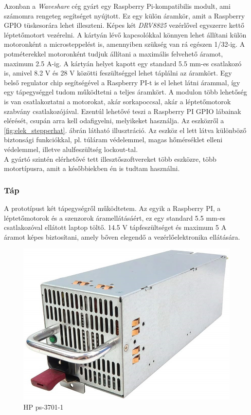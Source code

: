 \documentclass[12pt,a4paper]{article}
\begin{document}
Azonban a \textsl{Waveshare} cég gyárt egy Raspberry Pi-kompatibilis modult, ami számomra rengeteg segítséget nyújtott. Ez egy külön áramkör, amit a Raspberry GPIO tüskesorára lehet illeszteni. Képes két \textsl{DRV8825} vezérlővel egyszerre kettő léptetőmotort vezérelni. A kártyán lévő kapcsolókkal könnyen lehet állítani külön motoronként a microsteppelést is, amennyiben szükség van rá egészen 1/32-ig. A potméterekkel motoronként tudjuk állítani a maximális felvehető áramot, maximum 2.5 A-ig. A kártyán helyet kapott egy standard 5.5 mm-es csatlakozó is, amivel 8.2 V és 28 V közötti feszültséggel lehet táplálni az áramkört. Egy belső regulator chip segítségével a Raspberry PI-t is el lehet látni árammal, így egy tápegységgel tudom működtetni a teljes áramkört. A modulon több lehetőség is van csatlakoztatni a motorokat, akár sorkapoccsal, akár a léptetőmotorok szabvány csatlakozójával. Ezentúl lehetővé teszi a Raspberry PI GPIO lábainak elérését, csupán arra kell odafigyelni, melyikeket használja. Az eszközről a \ref{fig:elek_stepperhat}. ábrán látható illusztráció. Az eszköz el lett látva különböző biztonsági funkciókkal, pl. túláram védelemmel, magas hőmérséklet elleni védelemmel, illetve alulfeszültség lockout-tal.\\

A gyártó szintén elérhetővé tett illesztőszoftvereket több eszközre, több motortípusra, amit a későbbiekben én is tudtam használni.

\subsubsection*{Táp}

A prototípust két tápegységről működtetem. Az egyik a Raspberry PI, a léptetőmotorok és a szenzorok áramellátásáért, ez egy standard 5.5 mm-es csatlakozóval ellátott laptop töltő. 14.5 V tápfeszültséget és maximum 5 A áramot képes biztosítani, amely bőven elegendő a vezérlőelektronika ellátására.

\begin{figure}[h!]
	\centering
	\includegraphics[width=0.6\linewidth]{elek_hptap}
	\caption{HP ps-3701-1}
	\label{fig:elek_hptap}
\end{figure}
\end{document}
